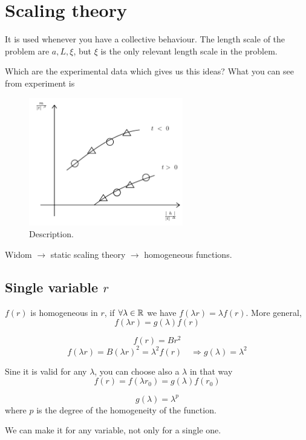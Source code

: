 \documentclass[../main/main.tex]{subfiles}
\begin{document}

\section{Scaling theory}
It is used whenever you have a collective behaviour. The length scale of the problem are \( a,L,\xi  \), but  \( \xi  \) is the only relevant length scale in the problem.

Which are the experimental data which gives us this ideas? What you can see from experiment is


\begin{figure}[h!]
\centering
\includegraphics[width=0.6\textwidth]{../lessons/19_image/1.pdf}
\caption{\label{fig:} Description.}
\end{figure}


Widom \( \rightarrow  \) static scaling theory \( \rightarrow  \) homogeneous functions.

\subsection{Single variable \( r \) }
\( f(r) \) is homogeneous in \( r \), if \( \forall  \lambda  \in \mathbb{R} \) we have
\( f( \lambda r) = \lambda f(r) \). More general,
\begin{equation}
  f( \lambda r) = g (\lambda) f(r)
\end{equation}
\begin{example}
\begin{equation}
  f(r) = B r^2
\end{equation}
\begin{equation}
  f ( \lambda r) = B ( \lambda r)^2 = \lambda ^2 f (r) \quad \Rightarrow g ( \lambda ) = \lambda ^2
\end{equation}
\end{example}
Sine it is valid for any \( \lambda  \), you can choose also a \( \lambda  \) in that way
\begin{equation}
  f(r) = f (\lambda r_0) = g (\lambda ) f (r_0)
\end{equation}
\begin{theorem}[]
\begin{equation}
  g(\lambda ) = \lambda ^p
\end{equation}
where \( p \) is the degree of the homogeneity of the function.
\end{theorem}
We can make it for any variable, not only for a single one.
\end{document}
